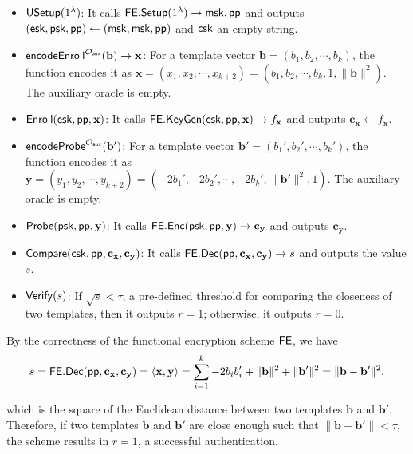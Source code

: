 \begin{itemize}

	\item ${\sf USetup}(1^\lambda)$: It calls ${\sf FE.Setup}(1^\lambda) \to {\sf msk}, {\sf pp}$ and outputs $({\sf esk}, {\sf psk}, {\sf pp}) \gets ({\sf msk}, {\sf msk}, {\sf pp})$ and ${\sf csk}$ an empty string.

	\item ${\sf encodeEnroll}^{\mathcal{O}_{\sf aux}}({\mathbf{b}}) \to \mathbf{x}$: For a template vector $\mathbf{b} = (b_1, b_2, \cdots, b_k)$, the function encodes it as $\mathbf{x} = (x_1, x_2, \cdots, x_{k+2}) = (b_1, b_2, \cdots, b_k, 1, \|\mathbf{b}\|^2)$. The auxiliary oracle is empty.

	\item ${\sf Enroll}({\sf esk}, {\sf pp}, \mathbf{x})$: It calls ${\sf FE.KeyGen}({\sf esk}, {\sf pp}, \mathbf{x}) \to f_\mathbf{x}$ and outputs $\mathbf{c_x} \gets f_\mathbf{x}$.

	\item ${\sf encodeProbe}^{\mathcal{O}_{\sf aux}}({\mathbf{b'}})$: For a template vector $\mathbf{b'} = (b_1', b_2', \cdots, b_k')$, the function encodes it as $\mathbf{y} = (y_1, y_2, \cdots, y_{k+2}) = (-2b_1', -2b_2', \cdots, -2b_k', \|\mathbf{b'}\|^2, 1)$. The auxiliary oracle is empty.

	\item ${\sf Probe}({\sf psk}, {\sf pp}, \mathbf{y})$: It calls ${\sf FE.Enc}({\sf psk}, {\sf pp}, \mathbf{y}) \to \mathbf{c_y}$ and outputs $\mathbf{c_y}$.

	\item ${\sf Compare}({\sf csk}, {\sf pp}, \mathbf{c_x}, \mathbf{c_y)}$: It calls ${\sf FE.Dec}({\sf pp}, \mathbf{c_x}, \mathbf{c_y}) \to s$ and outputs the value $s$.

	\item ${\sf Verify}(s)$: If $\sqrt{s} < \tau$, a pre-defined threshold for comparing the closeness of two templates, then it outputs $r = 1$; otherwise, it outputs $r = 0$.

\end{itemize}

By the correctness of the functional encryption scheme $\sf FE$, we have
\[
	s = {\sf FE.Dec}({\sf pp}, \mathbf{c_x}, \mathbf{c_y}) = \langle \mathbf{x}, \mathbf{y} \rangle = \sum_{i=1}^k -2b_ib_i' + \|\mathbf{b}\|^2 + \|\mathbf{b'}\|^2 = \| \mathbf{b} - \mathbf{b'} \|^2.
\]

which is the square of the Euclidean distance between two templates $\mathbf{b}$ and $\mathbf{b}'$. Therefore, if two templates $\mathbf{b}$ and $\mathbf{b}'$ are close enough such that $\|\mathbf{b} - \mathbf{b'}\| < \tau$, the scheme results in $r = 1$, a successful authentication.


